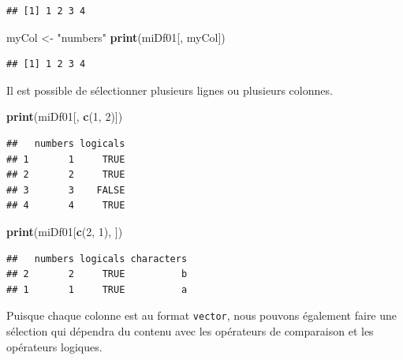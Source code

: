 \documentclass[
]{book}
\newenvironment{Shaded}{\begin{snugshade}}{\end{snugshade}}
\newcommand{\DecValTok}[1]{\textcolor[rgb]{0.00,0.00,0.81}{#1}}
\newcommand{\KeywordTok}[1]{\textcolor[rgb]{0.13,0.29,0.53}{\textbf{#1}}}
\newcommand{\NormalTok}[1]{#1}
\newcommand{\OperatorTok}[1]{\textcolor[rgb]{0.81,0.36,0.00}{\textbf{#1}}}
\newcommand{\StringTok}[1]{\textcolor[rgb]{0.31,0.60,0.02}{#1}}
\begin{document}
\begin{verbatim}
## [1] 1 2 3 4
\end{verbatim}

\begin{Shaded}
\begin{Highlighting}[]
\NormalTok{myCol <-}\StringTok{ "numbers"}
\KeywordTok{print}\NormalTok{(miDf01[, myCol])}
\end{Highlighting}
\end{Shaded}

\begin{verbatim}
## [1] 1 2 3 4
\end{verbatim}

Il est possible de sélectionner plusieurs lignes ou plusieurs colonnes.

\begin{Shaded}
\begin{Highlighting}[]
\KeywordTok{print}\NormalTok{(miDf01[, }\KeywordTok{c}\NormalTok{(}\DecValTok{1}\NormalTok{, }\DecValTok{2}\NormalTok{)])}
\end{Highlighting}
\end{Shaded}

\begin{verbatim}
##   numbers logicals
## 1       1     TRUE
## 2       2     TRUE
## 3       3    FALSE
## 4       4     TRUE
\end{verbatim}

\begin{Shaded}
\begin{Highlighting}[]
\KeywordTok{print}\NormalTok{(miDf01[}\KeywordTok{c}\NormalTok{(}\DecValTok{2}\NormalTok{, }\DecValTok{1}\NormalTok{), ])}
\end{Highlighting}
\end{Shaded}

\begin{verbatim}
##   numbers logicals characters
## 2       2     TRUE          b
## 1       1     TRUE          a
\end{verbatim}

Puisque chaque colonne est au format \texttt{vector}, nous pouvons également faire une sélection qui dépendra du contenu avec les opérateurs de comparaison et les opérateurs logiques.

\begin{Shaded}
\end{Shaded}
\end{document}
